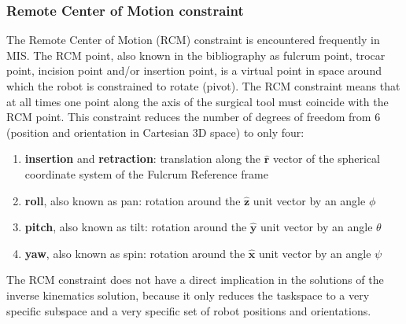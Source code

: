 \subsubsection{Remote Center of Motion constraint}
\label{rcm-subsubsection}

The Remote Center of Motion (RCM) constraint is encountered frequently in MIS. The RCM point, also known in the bibliography as fulcrum point, trocar point, incision point and/or insertion point, is a virtual point in space around which the robot is constrained to rotate (pivot). The RCM constraint means that at all times one point along the axis of the surgical tool must coincide with the RCM point. This constraint reduces the number of degrees of freedom from 6 (position and orientation in Cartesian 3D space) to only four:
\begin{enumerate}
\item \textbf{insertion} and \textbf{retraction}: translation along the $\mathbf{\hat{r}}$ vector of the spherical coordinate system of the Fulcrum Reference frame
\item \textbf{roll}, also known as pan: rotation around the $\mathbf{\hat{z}}$ unit vector by an angle $\phi$
\item \textbf{pitch}, also known as tilt: rotation around the $\mathbf{\hat{y}}$ unit vector by an angle $\theta$
\item \textbf{yaw}, also known as spin: rotation around the $\mathbf{\hat{x}}$ unit vector by an angle $\psi$
\end{enumerate}
The RCM constraint does not have a direct implication in the solutions of the inverse kinematics solution, because it only reduces the taskspace to a very specific subspace and a very specific set of robot positions and orientations.

